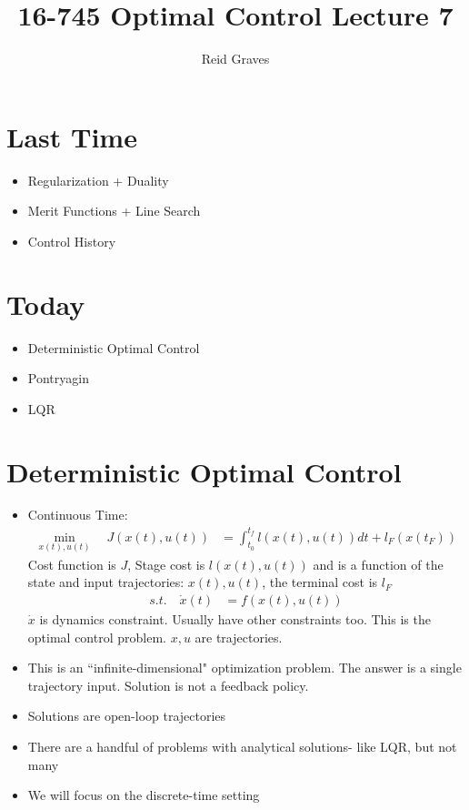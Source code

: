 \documentclass[11pt]{article}
\title{16-745 Optimal Control Lecture 7}
\author{Reid Graves}
\begin{document}
\maketitle

\section{Last Time}
\begin{itemize}
    \item Regularization + Duality
    \item Merit Functions + Line Search
    \item Control History
\end{itemize}

\section{Today}
\begin{itemize}
    \item Deterministic Optimal Control
    \item Pontryagin 
    \item LQR
\end{itemize}

\section{Deterministic Optimal Control}
\begin{itemize}
    \item Continuous Time:
    \begin{align*}
        \min_{x(t),u(t)} \quad J(x(t),u(t))&= \int_{t_0}^{t_f}l(x(t),u(t))dt + l_F(x(t_F))
    \end{align*}
    Cost function is $J$, Stage cost is $l(x(t),u(t))$ and is a function of  the state and input trajectories: $x(t),u(t)$, the terminal cost is $l_F$
    \begin{align*}
        s.t. \quad \dot{x}(t) &= f(x(t),u(t))
    \end{align*}
    $\dot{x}$ is dynamics constraint. Usually have other constraints too. This is the optimal control problem. $x,u$ are trajectories. 
    \item This is an ``infinite-dimensional" optimization problem. The answer is a single trajectory input. Solution is not a feedback policy.
    \item Solutions are open-loop trajectories
    \item There are a handful of problems with analytical solutions- like LQR, but not many
    \item We will focus on the discrete-time setting
\end{itemize}
\end{document}
